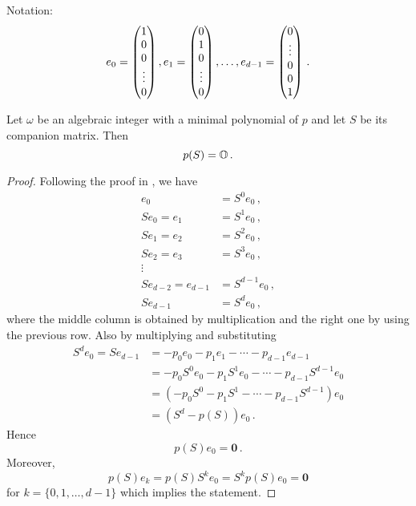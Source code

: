 Notation:
$$
e_0=\begin{pmatrix}
              1 \\
              0 \\
              0 \\
              \vdots \\
              0
              \end{pmatrix}, \\
e_1=\begin{pmatrix}
              0 \\
              1 \\
              0 \\
              \vdots \\
              0
              \end{pmatrix}, \dots ,\\
e_{d-1}=\begin{pmatrix}
              0 \\        
              \vdots \\
              0 \\
              0\\
              1
              \end{pmatrix}\,.             
$$


\begin{lem}
\label{lem:compMatrixIsRoot}
Let $\omega$ be an algebraic integer with a minimal polynomial of $p$ and let $S$ be its companion matrix. Then
$$
p(S)=\mathbb{O}\,.
$$
\end{lem}
\begin{proof}
Following the proof in \cite{horn}, we have
\begin{align*}
e_0&=S^0 e_0\,, \\
S e_0= e_1&=S^1 e_0\,, \\
S e_1= e_2&=S^2 e_0\,, \\
S e_2= e_3&=S^3 e_0\,, \\
\vdots & \\
S e_{d-2}= e_{d-1}&=S^{d-1} e_0\,, \\
S e_{d-1} &= S^{d} e_0\,,
\end{align*}
where the middle column is obtained by multiplication and the right one by using the previous row. 
Also by multiplying and substituting
\begin{align*}
S^{d} e_0=S e_{d-1}&= -p_0e_0-p_1e_1-\cdots-p_{d-1}e_{d-1} \\
    &= -p_0 S^{0}e_0-p_1S^{1}e_0-\cdots-p_{d-1}S^{d-1}e_{0} \\
    &= (-p_0 S^{0}-p_1S^{1}-\cdots-p_{d-1}S^{d-1})e_{0} \\
    &=(S^{d}-p(S))e_0\,.
\end{align*}
Hence
$$
p(S)e_0=\mathbf{0}\,.
$$
Moreover,
$$
p(S)e_k=p(S)S^k e_0=S^k p(S) e_0=\mathbf{0}
$$
for $k=\{0,1,\dots,d-1\}$ which implies the statement.
\end{proof}

